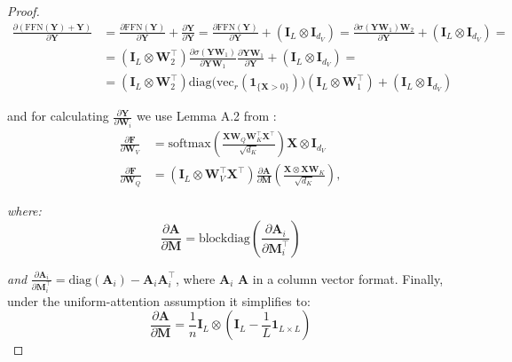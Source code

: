 \documentclass{article}
\begin{document}
\begin{proof}
\begin{align*}
    \frac{\partial (\text{FFN}(\mathbf{Y}) + \mathbf{Y})}{\partial \mathbf{Y}} &= \frac{\partial \text{FFN}(\mathbf{Y}) }{\partial \mathbf{Y}} + \frac{\partial \mathbf{Y}}{\partial \mathbf{Y}} = \frac{\partial \text{FFN}(\mathbf{Y}) }{\partial \mathbf{Y}} + \left( \mathbf{I}_L \otimes \mathbf{I}_{d_V}\right) = \frac{\partial \sigma(\mathbf{Y} \mathbf{W}_1) \mathbf{W}_2}{\partial \mathbf{Y}} +\left( \mathbf{I}_L \otimes \mathbf{I}_{d_V}\right)=\\ 
    &= \left( \mathbf{I}_L \otimes \mathbf{W}_2^\top\right) \frac{\partial \sigma (\mathbf{Y} \mathbf{W}_1)}{\partial \mathbf{Y}\mathbf{W}_1} \frac{\partial \mathbf{Y}\mathbf{W}_1}{\partial \mathbf{Y}} + \left( \mathbf{I}_L \otimes \mathbf{I}_{d_V}\right) = \\
    & = \left( \mathbf{I}_L \otimes \mathbf{W}_2^\top\right) \mathrm{diag}\!\big(\mathrm{vec}_r(\mathbf{1}_{\{\mathbf{X}>0\}})\big) \left( \mathbf{I}_L \otimes \mathbf{W}_1^\top \right) + \left( \mathbf{I}_L \otimes \mathbf{I}_{d_V}\right)
\end{align*}

and for calculating $\frac{\partial \mathbf{Y}}{\partial \mathbf{W}_i}$ we use Lemma A.2 from \cite{noci2022signalpropagationtransformerstheoretical}: 
\begin{align*}
\frac{\partial \mathbf{F}}{\partial \mathbf{W}_V} &= \text{softmax}\left(\frac{\mathbf{X}\mathbf{W}_Q\mathbf{W}_{K}^{\top}\mathbf{X}^\top}{\sqrt{d_K}}\right) \mathbf{X} \otimes \mathbf{I}_{d_V}\\
\frac{\partial \mathbf{F}}{\partial \mathbf{W}_Q} &= \left(\mathbf{I}_L \otimes \mathbf{W}_{V}^{\top}\mathbf{X}^\top\right) \frac{\partial \mathbf{A}}{\partial \mathbf{M}} \left(\frac{\mathbf{X} \otimes \mathbf{X}\mathbf{W}_K}{\sqrt{d_K}}\right),
\end{align*}

\textit{where:}
\begin{equation*}
\frac{\partial \mathbf{A}}{\partial \mathbf{M}} = \text{blockdiag}\left(\frac{\partial \mathbf{A}_i}{\partial \mathbf{M}_i^\top}\right)
\end{equation*}

\textit{and } $\frac{\partial \mathbf{A}_i}{\partial \mathbf{M}_i^\top} = \text{diag}(\mathbf{A}_i) - \mathbf{A}_i\mathbf{A}_i^\top$, where $\mathbf{A}_i$  $\mathbf{A}$ in a column vector format. Finally, under the uniform-attention assumption it simplifies to:
\begin{equation*}
\frac{\partial \mathbf{A}}{\partial \mathbf{M}} = \frac{1}{n}\mathbf{I}_L \otimes \left(\mathbf{I}_L - \frac{1}{L}\mathbf{1}_{L \times L}\right)
\end{equation*}


\end{proof}
\end{document}
